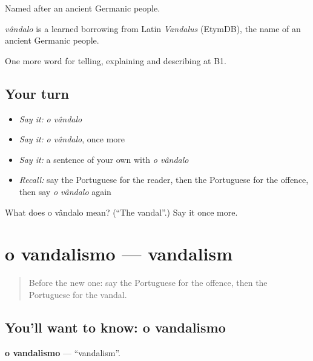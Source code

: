 Named after an ancient Germanic people.

\begin{cousinweb}
\emph{vândalo} is a learned borrowing from Latin \emph{Vandalus} (EtymDB), the name of an ancient Germanic people.
\end{cousinweb}

\begin{grammarlens}[title={What you've built}]
One more word for telling, explaining and describing at B1.
\end{grammarlens}

\subsection*{Your turn}
\begin{itemize}
\raggedright
  \item \emph{Say it:} \emph{o vândalo}
  \item \emph{Say it:} \emph{o vândalo}, once more
  \item \emph{Say it:} a sentence of your own with \emph{o vândalo}
  \item \emph{Recall:} say the Portuguese for the reader, then the Portuguese for the offence, then say \emph{o vândalo} again
\end{itemize}

\begin{tcolorbox}[breakable,colback=teal!4,colframe=teal!35!black,title={Before you move on}]
What does o vândalo mean? (\textquotedblleft{}The vandal\textquotedblright{}.) Say it once more.
\end{tcolorbox}
\section[o vandalismo]{o vandalismo — vandalism}

\label{lesson:PT-C286-vandalismo}



\begin{quote}
Before the new one: say the Portuguese for the offence, then the Portuguese for the vandal.
\end{quote}

\subsection*{You'll want to know: o vandalismo}
\textbf{o vandalismo} — \textquotedblleft{}vandalism\textquotedblright{}.


